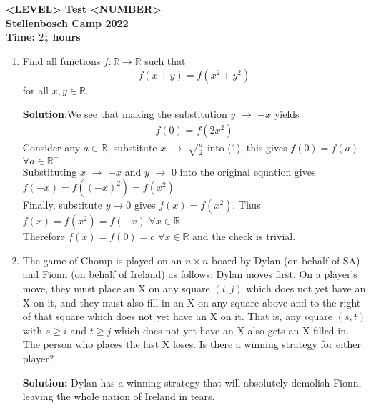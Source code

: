 \documentclass{article}
\begin{document}
\thispagestyle{empty}

\begin{center}
  \textbf{\Large <LEVEL> Test <NUMBER>}
  \\ \vspace{1em}
  \textbf{\large Stellenbosch Camp 2022}
  \\ \vspace{1em}
  \textbf{\large Time: $2\frac{1}{2}$ hours}
\end{center}

\bigskip

\begin{enumerate}[itemsep=\fill]

\item %
Find all functions $f : \mathbb{R} \to \mathbb{R}$ such that \[ f(x+y) = f(x^2+y^2) \] for all $x,y \in \mathbb{R}$.

\textbf{Solution}:We see that making the substitution $y$ $\rightarrow$ $-x$ yields 
\begin{align}
    f(0)=f(2x^{2})
\end{align}
Consider any $a \in \mathbb{R}$, substitute $x$ $\rightarrow$ $\sqrt{\frac{a}{2}}$ into (1), this gives $f(0) = f(a)$ $\forall a \in \mathbb{R^{+}}$
\\Substituting $x$ $\rightarrow$ $-x$ and $y$ $\rightarrow$ $0$ into the original equation gives $f(-x) = f((-x)^{2}) = f(x^{2})$
\\Finally, substitute $y \rightarrow 0$ gives $f(x) = f(x^{2})$. Thus $f(x)= f(x^{2}) = f(-x)$ $\forall x \in \mathbb{R}$
\\Therefore $f(x) = f(0) = c$ $\forall x \in \mathbb{R}$ and the check is trivial.


\item %
The game of Chomp is played on an $n \times n$ board by Dylan (on behalf of SA) and Fionn (on behalf of Ireland) as follows: Dylan moves first.
On a player's move, they must place an X on any square $(i, j)$ which does not yet have an X on it, and they must also fill in an X on any square above and to the right of that square which does not yet have an X on it.
That is, any square $(s, t)$ with $s \geq i$ and $t \geq j$ which does not yet have an X also gets an X filled in.
The person who places the last X loses.
Is there a winning strategy for either player?

\textbf{Solution:}
Dylan has a winning strategy that will absolutely demolish Fionn, leaving the whole nation of Ireland in tears. 


\end{enumerate}
\end{document}
